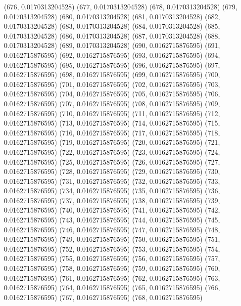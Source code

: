 {					(676, 0.0170313204528)
					(677, 0.0170313204528)
					(678, 0.0170313204528)
					(679, 0.0170313204528)
					(680, 0.0170313204528)
					(681, 0.0170313204528)
					(682, 0.0170313204528)
					(683, 0.0170313204528)
					(684, 0.0170313204528)
					(685, 0.0170313204528)
					(686, 0.0170313204528)
					(687, 0.0170313204528)
					(688, 0.0170313204528)
					(689, 0.0170313204528)
					(690, 0.0162715876595)
					(691, 0.0162715876595)
					(692, 0.0162715876595)
					(693, 0.0162715876595)
					(694, 0.0162715876595)
					(695, 0.0162715876595)
					(696, 0.0162715876595)
					(697, 0.0162715876595)
					(698, 0.0162715876595)
					(699, 0.0162715876595)
					(700, 0.0162715876595)
					(701, 0.0162715876595)
					(702, 0.0162715876595)
					(703, 0.0162715876595)
					(704, 0.0162715876595)
					(705, 0.0162715876595)
					(706, 0.0162715876595)
					(707, 0.0162715876595)
					(708, 0.0162715876595)
					(709, 0.0162715876595)
					(710, 0.0162715876595)
					(711, 0.0162715876595)
					(712, 0.0162715876595)
					(713, 0.0162715876595)
					(714, 0.0162715876595)
					(715, 0.0162715876595)
					(716, 0.0162715876595)
					(717, 0.0162715876595)
					(718, 0.0162715876595)
					(719, 0.0162715876595)
					(720, 0.0162715876595)
					(721, 0.0162715876595)
					(722, 0.0162715876595)
					(723, 0.0162715876595)
					(724, 0.0162715876595)
					(725, 0.0162715876595)
					(726, 0.0162715876595)
					(727, 0.0162715876595)
					(728, 0.0162715876595)
					(729, 0.0162715876595)
					(730, 0.0162715876595)
					(731, 0.0162715876595)
					(732, 0.0162715876595)
					(733, 0.0162715876595)
					(734, 0.0162715876595)
					(735, 0.0162715876595)
					(736, 0.0162715876595)
					(737, 0.0162715876595)
					(738, 0.0162715876595)
					(739, 0.0162715876595)
					(740, 0.0162715876595)
					(741, 0.0162715876595)
					(742, 0.0162715876595)
					(743, 0.0162715876595)
					(744, 0.0162715876595)
					(745, 0.0162715876595)
					(746, 0.0162715876595)
					(747, 0.0162715876595)
					(748, 0.0162715876595)
					(749, 0.0162715876595)
					(750, 0.0162715876595)
					(751, 0.0162715876595)
					(752, 0.0162715876595)
					(753, 0.0162715876595)
					(754, 0.0162715876595)
					(755, 0.0162715876595)
					(756, 0.0162715876595)
					(757, 0.0162715876595)
					(758, 0.0162715876595)
					(759, 0.0162715876595)
					(760, 0.0162715876595)
					(761, 0.0162715876595)
					(762, 0.0162715876595)
					(763, 0.0162715876595)
					(764, 0.0162715876595)
					(765, 0.0162715876595)
					(766, 0.0162715876595)
					(767, 0.0162715876595)
					(768, 0.0162715876595)
}
